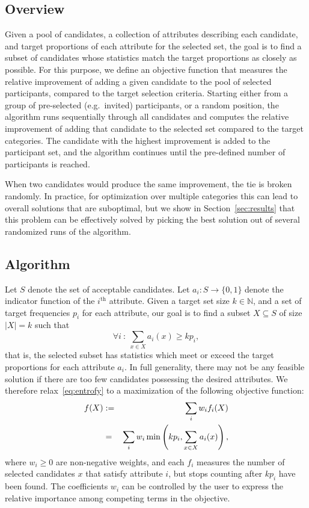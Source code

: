 \documentclass[10pt,letterpaper]{article}
\begin{document}
\subsection{Overview}

Given a pool of candidates, a collection of attributes describing each candidate, and target proportions of each attribute for the selected set, the goal is to find a subset of candidates whose statistics match the target proportions as closely as possible. 
For this purpose, we define an objective function that measures the relative improvement of adding a given candidate to the pool of selected participants, compared to the target selection criteria. Starting either from a group of pre-selected (e.g.\ invited) participants, or a random position, the algorithm runs sequentially through all candidates and computes the relative improvement of adding that candidate to the selected set compared to the target categories. The candidate with the highest improvement is added to the participant set, and the algorithm continues until the pre-defined number of participants is reached.

When two candidates would produce the same improvement, the tie is broken randomly.
In practice, for optimization over multiple categories this can lead to overall solutions that are suboptimal, but we show in Section~\ref{sec:results} that this problem can be effectively solved by picking the best solution out of several randomized runs of the algorithm. 

\subsection*{Algorithm}

Let $S$ denote the set of acceptable candidates.
Let ${a_i : S \rightarrow \{0, 1\}}$ denote the indicator function of the $i^\text{th}$ attribute.
Given a target set size $k \in \mathbb{N}$, and a set of target frequencies $p_i$ for each attribute, our
goal is to find a subset $X \subseteq S$ of size $|X|=k$ such that
\begin{equation}
    \forall i~:~\sum_{x \in X} a_i(x) \geq k p_i,\label{eq:entrofy}
\end{equation}
that is, the selected subset has statistics which meet or exceed the target proportions for each attribute $a_i$.
In full generality, there may not be any feasible solution if there are too few candidates possessing the desired attributes.
We therefore relax~\eqref{eq:entrofy} to a maximization of the following objective function:
\begin{eqnarray}
    f(X) &:=& \sum_i w_i f_i(X) \label{eq:entrofy-opt}\\
         &=& \sum_i w_i \min\left(k p_i, \sum_{x \in X} a_i(x)\right),\notag
\end{eqnarray}
where $w_i \geq 0$ are non-negative weights, and each $f_i$ measures the number of selected candidates $x$ that satisfy attribute $i$, but stops counting after $kp_i$ have been found.
The coefficients $w_i$ can be controlled by the user to express the relative importance among competing terms in the objective.
\end{document}
